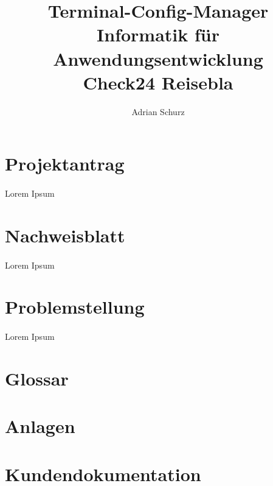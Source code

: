 \documentclass[a4paper,11pt]{article}
\author{Adrian Schurz}
\title{Terminal-Config-Manager\\
	Informatik für Anwendungsentwicklung\\
	Check24 Reisebla\\ %
	}
\begin{document}
\maketitle
{}
\newpage
{}

\section{Projektantrag}
\paragraph{}
Lorem Ipsum

\section{Nachweisblatt}
\paragraph{}
Lorem Ipsum

\newpage
\tableofcontents
\newpage


\section{Problemstellung}
\paragraph{}
Lorem Ipsum


\section{Glossar}


\section{Anlagen}

\section{Kundendokumentation}
\end{document}
